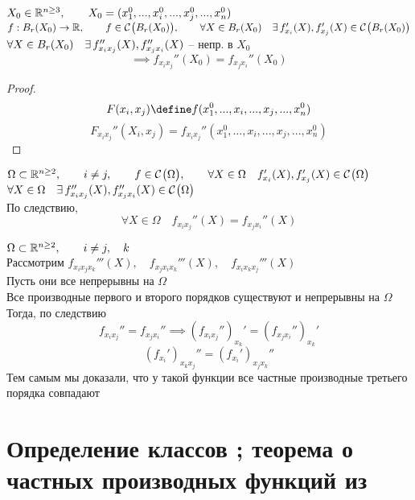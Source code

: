 \begin{implication}[для $ n > 2 $]
	$ X_0 \in \mathbb{R}^{n \ge 3}, \qquad X_0 = (x_1^0, ..., x_i^0, ..., x_j^0, ..., x_n^0) $ \\
	$ f : B_r(X_0) \to \mathbb{R}, \qquad f \in \mathcal{C}^{} \big( {B_r(X_0)} \big) , \qquad \forall X \in B_r(X_0) \quad \exists\, f_{x_i}'(X), f_{x_j}'(X) \in \mathcal{C}^{} \big( {B_r(X_0)} \big)  $ \\
	$ \forall X \in B_r(X_0) \quad \exists\, f_{x_ix_j}''(X), f_{x_jx_i}''(X) $ -- непр. в $ X_0 $
	$$ \implies f_{x_ix_j}''(X_0) = f_{x_jx_i}''(X_0) $$
\end{implication}

\begin{proof}
	$$ F(x_i, x_j) \define f(x_1^0, ..., x_i, ..., x_j, ..., x_n^0) $$
	$$ F_{x_ix_j}''(X_i, x_j) = f_{x_ix_j}''(x_1^0, ..., x_i, ..., x_j, ..., x_n^0) $$
\end{proof}

\begin{statement}
	$ \Omega \subset \mathbb{R}^{n \ge 2}, \qquad i \ne j, \qquad f \in \mathcal{C}^{} \big( {\Omega} \big) , \qquad \forall X \in \Omega \quad f_{x_i}'(X), f_{x_j}'(X) \in \mathcal{C}^{} \big( {\Omega} \big)  $ \\
	$ \forall X \in \Omega \quad \exists\, f_{x_ix_j}''(X), f_{x_jx_i}''(X) \in \mathcal{C}^{} \big( {\Omega} \big)  $ \\
	По следствию,
	$$ \forall X \in \Omega \quad f_{x_ix_j}''(X) = f_{x_jx_i}''(X) $$
\end{statement}

\begin{statement}
	$ \Omega \subset \mathbb{R}^{n \ge 2}, \qquad i \ne j, \quad k $ \\
	Рассмотрим $ f_{x_ix_jx_k}'''(X), \quad f_{x_jx_ix_k}'''(X), \quad f_{x_ix_kx_j}'''(X) $ \\
	Пусть они все непрерывны на $ \Omega $ \\
	Все производные первого и второго порядков существуют и непрерывны на $ \Omega $ \\
	Тогда, по следствию
	$$ f_{x_ix_j}'' = f_{x_jx_i}'' \implies (f_{x_ix_j}'')_{x_k}' = (f_{x_jx_i}'')_{x_k}' $$
	$$ (f_{x_i}')_{x_kx_j}'' = (f_{x_i}')_{x_jx_k}'' $$
	Тем самым мы доказали, что у такой функции все частные производные третьего порядка совпадают
\end{statement}

\section{Определение классов ; теорема о частных производных функций из }


